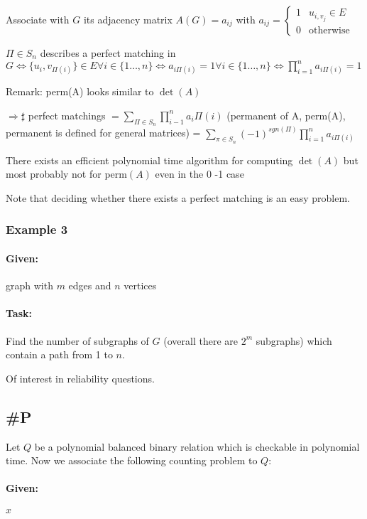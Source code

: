 \documentclass[11pt]{article}
\theoremstyle{definition}
\theoremstyle{definition}
\begin{document}
Associate with $ G $ its adjacency matrix $ A(G) = a_{ij} $ with $ a_{ij} = \left\{ \begin{array}{ll} 1 & u_{i, v_j} \in E \\ 0 & \text{otherwise} \end{array} \right. $

$ \Pi \in S_n $ describes a perfect matching in $ G  \Leftrightarrow \{ u_i, v_{\Pi(i)}\} \in E \forall i \in \{ 1 \dots, n \} \Leftrightarrow a_{i \Pi(i)} = 1 \forall i \in \{ 1 \dots, n \} \Leftrightarrow \prod \limits_{i = 1}^n a_{i\Pi(i)} = 1 $

Remark: perm(A) looks similar to $ \det(A) $

$ \Rightarrow \sharp $ perfect matchings $ = \sum \limits_{\Pi \in S_n} \prod \limits_{i - 1}^n a_i \Pi (i) $ (permanent of A, perm(A), permanent is defined for general matrices)
= $ \sum \limits_{\pi \in S_n} (-1)^{sgn(\Pi)} \prod \limits_{i=1}^n a_{i \Pi(i)} $

There exists an efficient polynomial time algorithm for computing $ \det(A) $ but most probably not for perm$(A)$ even in the 0 -1  case

Note that deciding whether there exists a perfect matching is an easy problem.

\subsubsection{Example 3}

\paragraph{Given:} graph with $ m $ edges and $ n $ vertices
\paragraph{Task:} Find the number of subgraphs of $ G $ (overall there are $ 2^m $ subgraphs) which contain a path from 1 to $ n $.

Of interest in reliability questions.

\subsection{\#P}

Let $ Q $ be a polynomial balanced binary relation which is checkable in polynomial time. Now we associate the following counting problem to $ Q $:

\paragraph{Given:} $ x $
\end{document}
